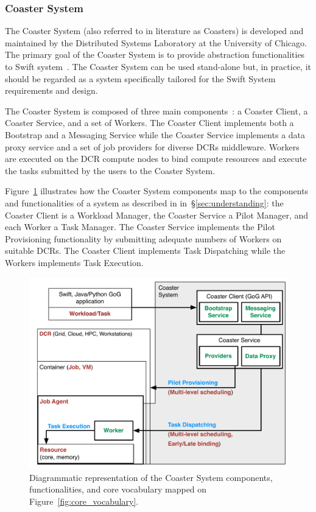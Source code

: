 \documentclass{sig-alternate}
\begin{document}
%
\subsubsection{Coaster System}\label{sec:coaster}

The Coaster System (also referred to in literature as Coasters) is developed and
maintained by the Distributed Systems Laboratory at the University of Chicago.
The primary goal of the Coaster System is to provide \pilot abstraction
functionalities to Swift system~\cite{wilde2011swift,zhao2007swift}. The Coaster
System can be used stand-alone but, in practice, it should be regarded as a
system specifically tailored for the Swift System requirements and design.

The Coaster System is composed of three main
components~\cite{hategan2011coasters}: a Coaster Client, a Coaster Service, and
a set of Workers. The Coaster Client implements both a Bootstrap and a Messaging
Service while the Coaster Service implements a data proxy service and a set of
job providers for diverse DCRs middleware. Workers are executed on the DCR
compute nodes to bind compute resources and execute the tasks submitted by the
users to the Coaster System.

Figure~\ref{fig:coaster_comparison} illustrates how the Coaster System
components map to the components and functionalities of a \pilot system as
described in in~\S\ref{sec:understanding}: the Coaster Client is a Workload
Manager, the Coaster Service a Pilot Manager, and each Worker a Task Manager.
The Coaster Service implements the Pilot Provisioning functionality by
submitting adequate numbers of Workers on suitable DCRs. The Coaster Client
implements Task Dispatching while the Workers implements Task Execution.

\begin{figure}[t]
    \centering
        \includegraphics[width=.48\textwidth]{figures/coaster_comparison.pdf}
    \caption{Diagrammatic representation of the Coaster System components,
    functionalities, and core vocabulary mapped on
    Figure~\ref{fig:core_vocabulary}.}
    \label{fig:coaster_comparison}
\end{figure}
\end{document}
